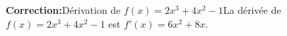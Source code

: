 \documentclass{standalone}
\begin{document}
\begin{minipage}{\textwidth}
\textbf{Correction:}Dérivation de $f(x) = 2x^3 + 4x^2 - 1$\newline La dérivée de $f(x) = 2x^3 + 4x^2 - 1$ est $f'(x) = 6x^2 + 8x$.
\end{minipage}
\end{document}
